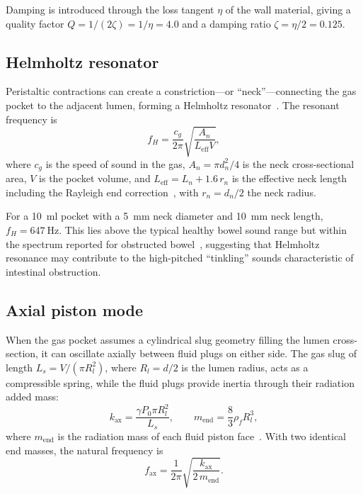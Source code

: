 \documentclass[review]{elsarticle}
\begin{document}
Damping is introduced through the loss tangent $\eta$ of the wall material,
giving a quality factor $Q = 1/(2\zeta) = 1/\eta = 4.0$ and a damping ratio
$\zeta = \eta/2 = 0.125$.

\subsection{Helmholtz resonator}
\label{sec:helmholtz}

Peristaltic contractions can create a constriction---or ``neck''---connecting
the gas pocket to the adjacent lumen, forming a Helmholtz
resonator~\cite{Rayleigh1896, Kinsler1999}.  The resonant frequency is
\begin{equation}
  f_H = \frac{c_g}{2\pi}\sqrt{\frac{A_n}{L_\mathrm{eff} V}},
  \label{eq:helmholtz}
\end{equation}
where $c_g$ is the speed of sound in the gas, $A_n = \pi d_n^2/4$ is the
neck cross-sectional area, $V$ is the pocket volume, and
$L_\mathrm{eff} = L_n + 1.6\,r_n$ is the effective neck length including the
Rayleigh end correction~\cite{Rayleigh1896}, with $r_n = d_n/2$ the neck
radius.

For a \SI{10}{\milli\litre} pocket with a \SI{5}{\milli\metre} neck diameter
and \SI{10}{\milli\metre} neck length, $f_H = \SI{647}{\hertz}$.  This
lies above the typical healthy bowel sound range but within the spectrum
reported for obstructed bowel~\cite{Ching2012, Yoshino1990}, suggesting that
Helmholtz resonance may contribute to the high-pitched ``tinkling'' sounds
characteristic of intestinal obstruction.

\subsection{Axial piston mode}
\label{sec:axial}

When the gas pocket assumes a cylindrical slug geometry filling the lumen
cross-section, it can oscillate axially between fluid plugs on either side.
The gas slug of length $L_s = V/(\pi R_l^2)$, where $R_l = d/2$ is the
lumen radius, acts as a compressible spring, while the fluid plugs provide
inertia through their radiation added mass:
\begin{equation}
  k_\mathrm{ax} = \frac{\gamma P_0 \pi R_l^2}{L_s}, \qquad
  m_\mathrm{end} = \frac{8}{3}\rho_f R_l^3,
  \label{eq:axial_params}
\end{equation}
where $m_\mathrm{end}$ is the radiation mass of each fluid piston
face~\cite{Kinsler1999}.  With two identical end masses, the natural
frequency is
\begin{equation}
  f_\mathrm{ax} = \frac{1}{2\pi}\sqrt{\frac{k_\mathrm{ax}}{2\,m_\mathrm{end}}}.
  \label{eq:axial}
\end{equation}
\end{document}
